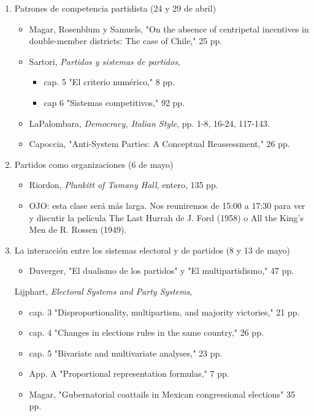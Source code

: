\documentclass{article}
\begin{document}
\begin{enumerate}
\begin{itemize}
\end{itemize}
\item Patrones de competencia partidista  (24 y 29 de abril)
\label{sec:org8bf2993}
\begin{itemize}
\item Magar, Rosenblum y Samuels, "On the absence of centripetal incentives in double-member districts: The case of Chile," 25 pp.
\item Sartori, \emph{Partidos y sistemas de partidos}, 
\begin{itemize}
\item cap. 5 "El criterio numérico," 8 pp.
\item cap 6 "Sistemas competitivos," 92 pp.
\end{itemize}
\item LaPalombara, \emph{Democracy, Italian Style}, pp. 1-8, 16-24, 117-143.
\item Capoccia, "Anti-System Parties: A Conceptual Reassessment," 26 pp.
\end{itemize}
\item Partidos como organizaciones  (6 de mayo)
\label{sec:org2ac800e}
\begin{itemize}
\item Riordon, \emph{Plunkitt of Tamany Hall}, entero, 135 pp.
\item OJO: esta clase será más larga. Nos reuniremos de 15:00 a 17:30 para ver y discutir la película The Last Hurrah de J. Ford (1958) o All the King’s Men de R. Rossen (1949).
\end{itemize}
\item La interacción entre los sistemas electoral y de partidos  (8 y 13 de mayo)
\label{sec:org3f66329}
\begin{itemize}
\item Duverger, "El dualismo de los partidos" y "El multipartidismo," 47 pp.
\end{itemize}
Lijphart, \emph{Electoral Systems and Party Systems}, 
\begin{itemize}
\item cap. 3 "Disproportionality, multipartism, and majority victories," 21 pp.
\item cap. 4 "Changes in elections rules in the same country," 26 pp.
\item cap. 5 "Bivariate and multivariate analyses," 23 pp.
\item App. A "Proportional representation formulas," 7 pp.
\end{itemize}
\begin{itemize}
\item Magar, "Gubernatorial coattails in Mexican congressional elections" 35 pp.
\end{itemize}
\end{enumerate}
\end{document}

